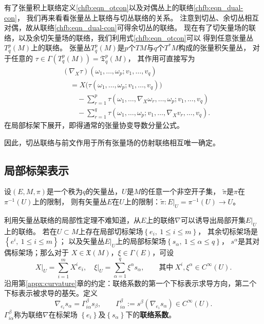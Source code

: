 有了张量积上联络定义\eqref{chfb:eqn_otcon}以及对偶丛上的联络\eqref{chfb:eqn_dual-con}，
我们再来看看张量丛上联络与切丛联络的关系。
注意到切丛、余切丛相互对偶，故从联络\eqref{chfb:eqn_dual-con}可得余切丛的联络。
现在有了切矢量场的联络，以及余切矢量场的联络，我们利用式\eqref{chfb:eqn_otcon}可以
得到任意张量丛 $T_q^p(M)$上的联络。
张量丛$T_q^p(M)$是$p$个$TM$与$q$个$T^* M$构成的张量积矢量丛，
对于任意的 $\tau \in \Gamma (T_q^p(M)) =\mathfrak{T}_q^p(M)$，
其作用可直接写为
\begin{align*}
    &(\nabla_X\tau)(\omega_1,\ldots,\omega_p;v_1,\ldots,v_q)\\
    &\quad=X\bigl(\tau(\omega_1,\ldots,\omega_p;v_1,\ldots,v_q)\bigr)\\
    &\qquad-\sum_{r=1}^{p}\tau(\omega_1,\ldots,\nabla_X\omega_r,\ldots,\omega_p;v_1,\ldots,v_q)\\
    &\qquad-\sum_{r=1}^{q}\tau(\omega_1,\ldots,\omega_p;v_1,\ldots,\nabla_Xv_r,\ldots,v_q).
\end{align*}
在局部标架下展开，即得通常的张量协变导数分量公式。

因此，切丛联络与前文作用于所有张量场的仿射联络相互唯一确定。

\subsection{局部标架表示}\label{chfb:sec_vc}

设$(E,M,\pi)$是一个秩为$q$的矢量丛，$U$是$M$的任意一个非空开子集，
$\tilde{\pi}$是$\pi$在 $\pi^{-1}(U)$上的限制，
则有矢量丛$E$在$U$上的限制：$\tilde{\pi}:\left.E\right|_U=\pi^{-1}(U) \to U$。

利用矢量丛联络的局部性定理不难知道，从$E$上的联络$\nabla$可以诱导出局部开集$\left.E\right|_U$上的联络。
若在$U\subset M$上存在局部切标架场$\left\{e_i,\ 1 \leqslant i \leqslant m\right\}$，
其余切标架场是$\left\{e^{i},\ 1 \leqslant i \leqslant m\right\}$；
以及矢量丛$\left.E\right|_U$上的局部标架场$\left\{s_\alpha,\ 1 \leqslant \alpha \leqslant q\right\}$，
$s^{\alpha}$是其对偶标架场；那么对于 $X \in \mathfrak{X}(M)$，$ \xi \in \Gamma(E)$，可设
\begin{equation*}
    \left.X\right|_U= \sum_{i=1}^{m}X^i e_i,\left.\quad
    \xi\right|_U= \sum_{\alpha=1}^{q}\xi^\alpha s_\alpha,
    \qquad \text{其中} \  X^i, \xi^\alpha \in C^{\infty}(U) .
\end{equation*}
沿用第\ref{appx:curvature}章的约定：联络系数的第一个下标表示求导方向，第二个下标表示被求导的基矢。定义
\begin{equation}\label{chfb:eqn_con-Gamma}
    \nabla_{e_i}s_\alpha=\Gamma^\beta_{i \alpha} s_\beta,\qquad
    \Gamma^\beta_{i \alpha}:=s^{\beta}(\nabla_{e_i}s_\alpha)\in C^\infty(U).
\end{equation}
$\Gamma^\beta_{i \alpha}$称为联络$\nabla$在标架场
$\left\{e_i\right\}$及$\left\{s_\alpha\right\}$下的\textbf{联络系数}。

